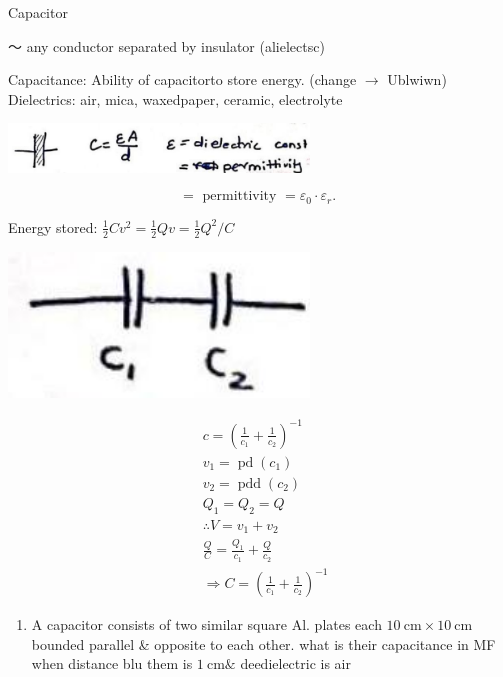 \documentclass[12pt, a4paper]{article}
\newcommand{\figwidth}{8cm}
\begin{document}
Capacitor

〜 any conductor separated by insulator (alielectsc)

Capacitance: Ability of capacitorto store energy. (change $\rightarrow$ Ublwiwn) Dielectrics: air, mica, waxedpaper, ceramic, electrolyte

\begin{center}
	\includegraphics[max width=\figwidth]{2024_06_15_f9b8f5fbbfa74e15de4eg-6(1)}
\end{center}

$$
	=\text { permittivity }=\varepsilon_{0} \cdot \varepsilon_{r} \text {. }
$$

Energy stored: $\frac{1}{2} C v^{2}=\frac{1}{2} Q v=\frac{1}{2} Q^{2} / C$

\begin{center}
	\includegraphics[max width=\figwidth]{2024_06_15_f9b8f5fbbfa74e15de4eg-7}
\end{center}

$$
	\begin{aligned}
		 & c=\left(\frac{1}{c_{1}}+\frac{1}{c_{2}}\right)^{-1}             \\
		 & v_{1}=\operatorname{pd}\left(c_{1}\right)                       \\
		 & v_{2}=\operatorname{pdd}\left(c_{2}\right)                      \\
		 & Q_{1}=Q_{2}=Q                                                   \\
		 & \therefore V=v_{1}+v_{2}                                        \\
		 & \frac{Q}{C}=\frac{Q_{1}}{c_{1}}+\frac{Q}{c_{2}}                 \\
		 & \Rightarrow C=\left(\frac{1}{c_{1}}+\frac{1}{c_{2}}\right)^{-1}
	\end{aligned}
$$

\begin{enumerate}
	\item A capacitor consists of two similar square Al. plates each $10 \mathrm{~cm} \times 10 \mathrm{~cm}$ bounded parallel \& opposite to each other. what is their capacitance in MF when distance blu them is $1 \mathrm{~cm} \&$ deedielectric is air
\end{enumerate}
\end{document}
